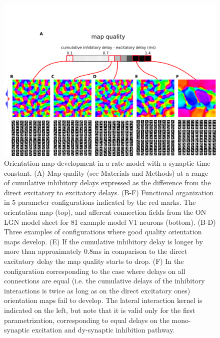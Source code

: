 \documentclass[utf8]{frontiersSCNS}
\begin{document}
\begin{figure}[htpb!] 
\centering
\includegraphics[width=16cm]{./SVG/Figure4/figure4.png}
\caption{Orientation map development in a rate model with a synaptic time constant. (A) Map quality (see Materials and Methods) at a range of 
cumulative inhibitory delays expressed as the difference from the direct excitatory to excitatory delays. (B-F) Functional organization in 5 parameter configurations indicated by the red marks. The orientation map (top), and afferent connection fields from the ON LGN model sheet for 81 example model V1 neurons (bottom). (B-D) Three examples of configurations where good quality orientation maps develop. (E) If the cumulative inhibitory delay is longer by more than approximately 0.8ms in comparison to the direct excitatory delay the map quality starts to drop. (F) In the configuration corresponding to the case where delays on all connections are equal (i.e. the cumulative delays of the inhibitory interactions is twice as long as on the direct excitatory ones) orientation maps fail to develop. The lateral interaction kernel is indicated on the left, but note that it is valid only
for the first parametrization, corresponding to equal delays on the mono-synaptic excitation and dy-synaptic inhibition pathway.}
\label{fig:figure4}
\end{figure} 
\end{document}
